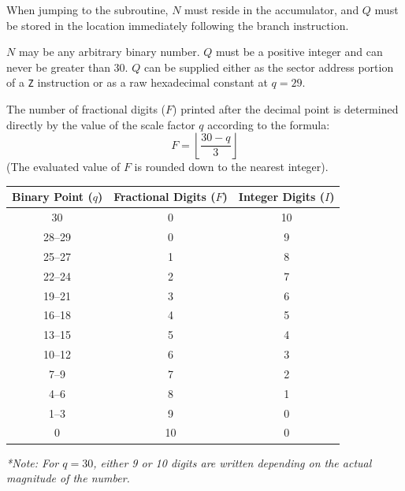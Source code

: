 When jumping to the subroutine, $N$ must reside in the accumulator, and $Q$ must be stored in the location immediately following the branch instruction.

$N$ may be any arbitrary binary number. $Q$ must be a positive integer and can never be greater than 30. $Q$ can be supplied either as the sector address portion of a \texttt{Z} instruction or as a raw hexadecimal constant at $q=29$.

The number of fractional digits ($F$) printed after the decimal point is determined directly by the value of the scale factor $q$ according to the formula:
\[
F = \left\lfloor \frac{30 - q}{3} \right\rfloor
\]
(The evaluated value of $F$ is rounded down to the nearest integer).

\begin{center}
\begin{tabular}{ccc}
    \toprule
    \textbf{Binary Point ($q$)} & \textbf{Fractional Digits ($F$)} & \textbf{Integer Digits ($I$)} \\
    \midrule
    30      & 0\text{*} & 10 \\
    28--29  & 0         & 9  \\
    25--27  & 1         & 8  \\
    22--24  & 2         & 7  \\
    19--21  & 3         & 6  \\
    16--18  & 4         & 5  \\
    13--15  & 5         & 4  \\
    10--12  & 6         & 3  \\
    7--9    & 7         & 2  \\
    4--6    & 8         & 1  \\
    1--3    & 9         & 0  \\
    0       & 10        & 0  \\
    \bottomrule
\end{tabular}
\end{center}
\textit{*Note: For $q = 30$, either 9 or 10 digits are written depending on the actual magnitude of the number.}

